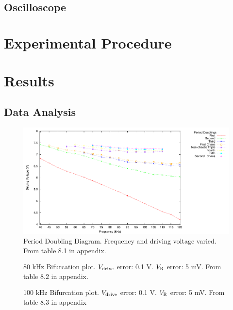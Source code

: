 \documentclass[12pt]{report}
\begin{document}
\section{Oscilloscope}
\label{sec:Oscilloscope}


\chapter{Experimental Procedure}



\chapter{Results}

\section{Data Analysis} %
\label{sec:Data Analysis}

	\begin{figure}[h]
		\centering
		\includegraphics{plots/general.pdf}
		\caption{Period Doubling Diagram. Frequency and driving voltage varied. From table 8.1 in appendix.}
		\label{fig:periodDoubling}
	\end{figure}



	\begin{figure}[h]
		\centering
		
		\caption{80 kHz Bifurcation plot. $V_{\rm drive}$ error: 0.1 V. $V_{\rm R}$ error: 5 mV. From table 8.2 in appendix.}
		\label{fig:80khzBifurcation}
	\end{figure}

	\begin{figure}[h]
		\centering
		
		\caption{100 kHz Bifurcation plot. $V_{\rm drive}$ error: 0.1 V. $V_{\rm R}$ error: 5 mV. From table 8.3 in appendix}
		\label{fig:100khzBifurcation}
	\end{figure}
	
\end{document}
